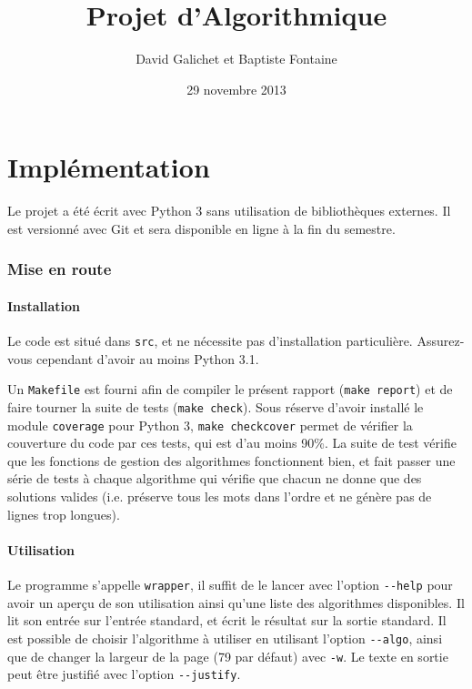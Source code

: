\documentclass[a4paper, 11pt]{article}
\begin{document}
\title{Projet d'Algorithmique}
\author{David Galichet et Baptiste Fontaine}
\date{29 novembre 2013}
\maketitle
\tableofcontents
\newpage


\part{Implémentation}

Le projet a été écrit avec Python 3 sans utilisation de bibliothèques externes.
Il est versionné avec Git et sera disponible en ligne à la fin du semestre.

\section{Mise en route}
\subsection{Installation}

Le code est situé dans \verb|src|, et ne nécessite pas d'installation
particulière. Assurez-vous cependant d'avoir au moins Python 3.1.

Un \verb|Makefile| est fourni afin de compiler le présent rapport
(\verb|make report|) et de faire tourner la suite de tests (\verb|make check|).
Sous réserve d'avoir installé le module \verb|coverage| pour Python 3,
\verb|make checkcover| permet de vérifier la couverture du code par ces tests,
qui est d'au moins 90\%.  La suite de test vérifie que les fonctions de gestion
des algorithmes fonctionnent bien, et fait passer une série de tests à chaque
algorithme qui vérifie que chacun ne donne que des solutions valides (i.e.
préserve tous les mots dans l'ordre et ne génère pas de lignes trop longues).

\subsection{Utilisation}

Le programme s'appelle \verb|wrapper|, il suffit de le lancer avec l'option
\verb|--help| pour avoir un aperçu de son utilisation ainsi qu'une liste des
algorithmes disponibles. Il lit son entrée sur l'entrée standard, et écrit le
résultat sur la sortie standard. Il est possible de choisir l'algorithme à
utiliser en utilisant l'option \verb|--algo|, ainsi que de changer la largeur
de la page (79 par défaut) avec \verb|-w|. Le texte en sortie peut être
justifié avec l'option \verb|--justify|.
\end{document}
